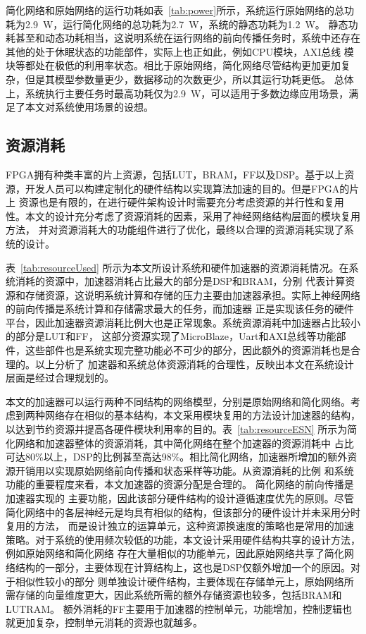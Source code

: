 简化网络和原始网络的运行功耗如表~\ref{tab:power}所示，系统运行原始网络的总功耗为2.9~W，运行简化网络的总功耗为2.7~W，系统的静态功耗为1.2~W。
静态功耗甚至和动态功耗相当，这说明系统在运行网络的前向传播任务时，系统中还存在其他的处于休眠状态的功能部件，实际上也正如此，例如CPU模块，AXI总线
模块等都处在极低的利用率状态。相比于原始网络，简化网络尽管结构更加更加复杂，但是其模型参数量更少，数据移动的次数更少，所以其运行功耗更低。
总体上，系统执行主要任务时最高功耗仅为2.9~W，可以适用于多数边缘应用场景，满足了本文对系统使用场景的设想。

\subsection{资源消耗}
FPGA拥有种类丰富的片上资源，包括LUT，BRAM，FF以及DSP。基于以上资源，开发人员可以构建定制化的硬件结构以实现算法加速的目的。但是FPGA的片上
资源也是有限的，在进行硬件架构设计时需要充分考虑资源的并行性和复用性。本文的设计充分考虑了资源消耗的因素，采用了神经网络结构层面的模块复用方法，
并对资源消耗大的功能组件进行了优化，最终以合理的资源消耗实现了系统的设计。


表~\ref{tab:resourceUsed} 所示为本文所设计系统和硬件加速器的资源消耗情况。在系统消耗的资源中，加速器消耗占比最大的部分是DSP和BRAM，分别
代表计算资源和存储资源，这说明系统计算和存储的压力主要由加速器承担。实际上神经网络的前向传播是系统计算和存储需求最大的任务，而加速器
正是实现该任务的硬件平台，因此加速器资源消耗比例大也是正常现象。系统资源消耗中加速器占比较小的部分是LUT和FF，
这部分资源实现了MicroBlaze，Uart和AXI总线等功能部件，这些部件也是系统实现完整功能必不可少的部分，因此额外的资源消耗也是合理的。以上分析了
加速器和系统总体资源消耗的合理性，反映出本文在系统设计层面是经过合理规划的。

本文的加速器可以运行两种不同结构的网络模型，分别是原始网络和简化网络。考虑到两种网络存在相似的基本结构，本文采用模块复用的方法设计加速器的结构，
以达到节约资源并提高各硬件模块利用率的目的。表~\ref{tab:resourceESN} 所示为简化网络和加速器整体的资源消耗，其中简化网络在整个加速器的资源消耗中
占比可达80\%以上，DSP的比例甚至高达98\%。相比简化网络，加速器所增加的额外资源开销用以实现原始网络前向传播和状态采样等功能。从资源消耗的比例
和系统功能的重要程度来看，本文加速器的资源分配是合理的。
简化网络的前向传播是加速器实现的
主要功能，因此该部分硬件结构的设计遵循速度优先的原则。尽管简化网络中的各层神经元是均具有相似的结构，但该部分的硬件设计并未采用分时复用的方法，
而是设计独立的运算单元，这种资源换速度的策略也是常用的加速策略。对于系统的使用频次较低的功能，本文设计采用硬件结构共享的设计方法，例如原始网络和简化网络
存在大量相似的功能单元，因此原始网络共享了简化网络结构的一部分，主要体现在计算结构上，这也是DSP仅额外增加一个的原因。对于相似性较小的部分
则单独设计硬件结构，主要体现在存储单元上，原始网络所需存储的向量维度更大，因此系统所需的额外存储资源也较多，包括BRAM和LUTRAM。
额外消耗的FF主要用于加速器的控制单元，功能增加，控制逻辑也就更加复杂，控制单元消耗的资源也就越多。


